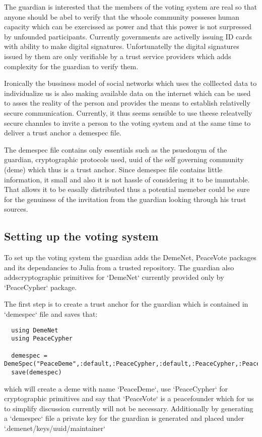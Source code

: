 \documentclass{article}
\begin{document}
The guardian is interested that the members of the voting system are real so that anyone should be abel to verify that the whoole community posseses human capacity which can be exercissed as power and that this power is not surpressed by unfounded participants. Currently governments are activelly issuing ID cards with ability to make digital signatures. Unfortunatelly the digital signatures issued by them are only verifiable by a trust service providers which adds complexity for the guardian to verify them.

Ironically the bussiness model of social networks which uses the colllected data to individualize us is also making available data on the internet which can be used to asses the reality of the person and provides the means to establish relativelly secure communication. Currently, it thus seems sensible to use theese releatvelly secure channles to invite a person to the voting system and at the same time to deliver a trust anchor a demespec file.

The demespec file contains only essentials such as the psuedonym of the guardian, cryptographic protocols used, uuid of the self governing community (deme) which thus is a trust anchor. Since demespec file contains little information, it small and also it is not hassle of considering it to be immutable. That allows it to be easally distributed thus a potential memeber could be sure for the genuiness of the invitation from the guardian looking through his trust sources.

\subsection{Setting up the voting system}

To set up the voting system the guardian adds the DemeNet, PeaceVote packages and its dependancies to Julia from a trusted repository. The guardian also addscryptographic primitives for `DemeNet` currently provided only by `PeaceCypher` package.

The first step is to create a trust anchor for the guardian which is contained in `demespec` file and saves that:
\begin{lstlisting}
  using DemeNet
  using PeaceCypher

  demespec = DemeSpec("PeaceDeme",:default,:PeaceCypher,:default,:PeaceCypher,:PeaceVote)
  save(demespec)
\end{lstlisting}
which will create a deme with name `PeaceDeme`, use `PeaceCypher` for cryptographic primitives and say that `PeaceVote` is a peacefounder which for us to simplify discussion currently will not be necessary. Additionally by generating a `demespec` file a private key for the guardian is generated and placed under `.demenet/keys/uuid/maintainer` 
\end{document}
